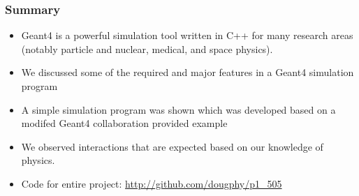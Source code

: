 \documentclass[mathserif,18pt,xcolor=table]{beamer}
\begin{document}
\begin{frame}
  \frametitle{Summary}
  {\footnotesize
  \begin{itemize}
    \item Geant4 is a powerful simulation tool written in C++ for many research areas (notably particle and nuclear, medical, and space physics).
    \item We discussed some of the required and major features in a Geant4 simulation program
    \item A simple simulation program was shown which was developed based on a modifed Geant4 collaboration provided example
    \item We observed interactions that are expected based on our knowledge of physics.
    \item Code for entire project: \url{http://github.com/dougphy/p1_505}
  \end{itemize}}
\end{frame}
\end{document}
